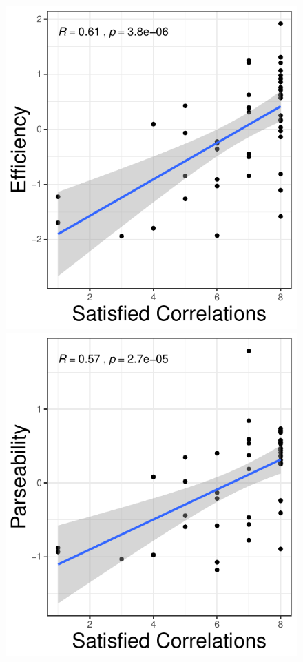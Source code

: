 \documentclass[10pt,twoside,lineno]{article}
\begin{document}
\begin{figure}[ht]
    \centering
    
    \includegraphics[scale=.55]{../results/correlations/correlations-by-grammar/ground-corrs-efficiency.pdf}
    \includegraphics[scale=.55]{../results/correlations/correlations-by-grammar/ground-corrs-parseability.pdf}

\end{figure}
\end{document}
